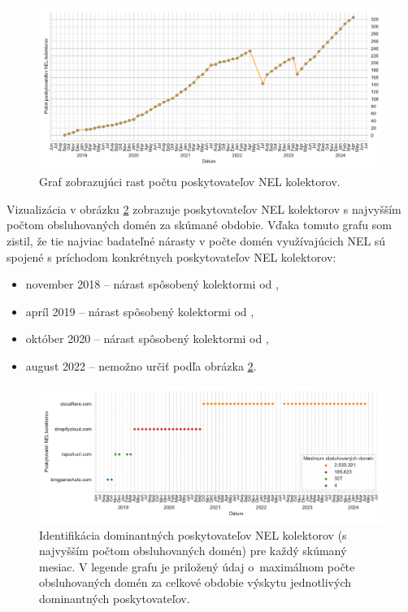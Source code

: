 \begin{figure}[!htb]
\begin{center}
 \includegraphics[scale=0.57]{obrazky-figures/httparchive_nel_collector_provider_count.pdf}
 \caption{Graf zobrazujúci rast počtu poskytovateľov NEL kolektorov.}
 \label{fig:httparchive-nel-collector-provider-count}
\end{center}
\end{figure}

Vizualizácia v obrázku \ref{fig:httparchive-nel-collector-provider-top-1-over-time} zobrazuje poskytovateľov NEL kolektorov s najvyšším počtom obsluhovaných domén za skúmané obdobie. 
Vďaka tomuto grafu som zistil, že tie najviac badateľné nárasty v počte domén využívajúcich NEL sú spojené s príchodom konkrétnych poskytovateľov NEL kolektorov:
\begin{itemize}
\item november 2018 -- nárast spôsobený kolektormi od ,
\item apríl 2019 -- nárast spôsobený kolektormi od ,
\item október 2020 -- nárast spôsobený kolektormi od ,
\item august 2022 -- nemožno určiť podľa obrázka \ref{fig:httparchive-nel-collector-provider-top-1-over-time}.
\end{itemize}

\begin{figure}[!htb]
\begin{center}
 \includegraphics[scale=0.598]{obrazky-figures/httparchive_nel_collector_provider_top_1_over_time.pdf}
 \caption{Identifikácia dominantných poskytovateľov NEL kolektorov (s najvyšším počtom obsluhovaných domén) pre každý skúmaný mesiac. V legende grafu je priložený údaj \mbox{o maximálnom} počte obsluhovaných domén za celkové obdobie výskytu jednotlivých dominantných poskytovateľov.}
 \label{fig:httparchive-nel-collector-provider-top-1-over-time}
\end{center}
\end{figure}

